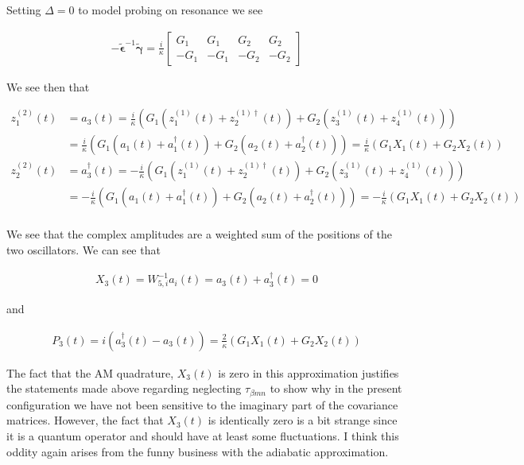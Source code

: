 \documentclass[12pt]{article}
\newcommand{\bv}[1]{\boldsymbol{#1}}
\begin{document}
Setting $\Delta = 0$ to model probing on resonance we see

\begin{align}
-\tilde{\bv{\epsilon}}^{-1}\tilde{\bv{\gamma}} = \frac{i}{\kappa}
\begin{bmatrix}
G_1 & G_1 & G_2 & G_2\\
-G_1 & -G_1 & -G_2 & -G_2
\end{bmatrix}
\end{align}

We see then that

\begin{align}
z^{(2)}_{1}(t) &= a_3(t) = \frac{i}{\kappa}\left(G_1 \left(z^{(1)}_{1}(t) + z^{({1})\dag}_{2}(t)\right) + G_2\left(z^{(1)}_{3}(t) + z^{(1)}_{4}(t)\right)\right)\\
&=\frac{i}{\kappa}\left(G_1\left(a_1(t) + a^{\dag}_1(t)\right) + G_2\left(a_2(t) + a^{\dag}_2(t)\right)\right)= \frac{i}{\kappa}\left(G_1 X_1(t) + G_2 X_2(t)\right)\\
z^{(2)}_{2}(t) &= a^{\dag}_3(t) = -\frac{i}{\kappa}\left(G_1 \left(z^{(1)}_{1}(t) + z^{({1})\dag}_{2}(t)\right) + G_2\left(z^{(1)}_{3}(t) + z^{(1)}_{4}(t)\right)\right)\\
&=-\frac{i}{\kappa}\left(G_1\left(a_1(t) + a^{\dag}_1(t)\right) + G_2\left(a_2(t) + a^{\dag}_2(t)\right)\right)= -\frac{i}{\kappa}\left(G_1 X_1(t) + G_2 X_2(t)\right)\\
\end{align}

We see that the complex amplitudes are a weighted sum of the positions of the two oscillators. We can see that

\begin{align}
X_3(t) = W^{-1}_{5,i}a_i(t) = a_3(t)+a^{\dag}_3(t) = 0
\end{align}

and

\begin{align}
P_3(t) = i(a^{\dag}_3(t)-a_3(t)) = \frac{2}{\kappa}(G_1 X_1(t) + G_2 X_2(t))
\end{align}

The fact that the AM quadrature, $X_3(t)$ is zero in this approximation justifies the statements made above regarding neglecting $\tau_{\beta mn}$ to show why in the present configuration we have not been sensitive to the imaginary part of the covariance matrices. However, the fact that $X_3(t)$ is identically zero is a bit strange since it is a quantum operator and should have at least some fluctuations. I think this oddity again arises from the funny business with the adiabatic approximation.
\end{document}
